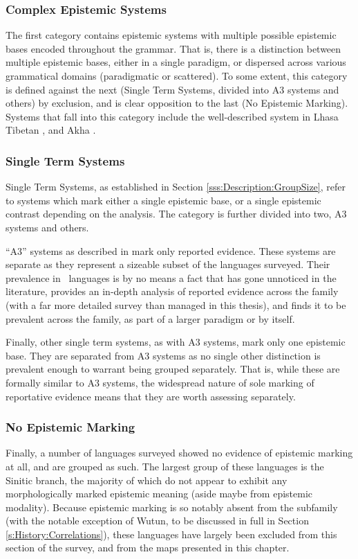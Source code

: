 \subsubsection{Complex Epistemic Systems}
The first category contains epistemic systems with multiple possible epistemic bases encoded throughout the grammar. That is, there is a distinction between multiple epistemic bases, either in a single paradigm, or dispersed across various grammatical domains (paradigmatic or scattered). To some extent, this category is defined against the next (Single Term Systems, divided into A3 systems and others) by exclusion, and is clear opposition to the last (No Epistemic Marking). Systems that fall into this category include the well-described system in Lhasa Tibetan \cite{DeLancey2017Tibetan}, and Akha \cite{Thurgood1986}.
\subsubsection{Single Term Systems}
Single Term Systems, as established in Section \ref{sss:Description:GroupSize}, refer to systems which mark either a single epistemic base, or a single epistemic contrast depending on the analysis. The category is further divided into two, A3 systems and others.

``A3'' systems as described in  mark only reported evidence. These systems are separate as they represent a sizeable subset of the languages surveyed. Their prevalence in \lfam\ languages is by no means a fact that has gone unnoticed in the literature,  provides an in-depth analysis of reported evidence across the family (with a far more detailed survey than managed in this thesis), and finds it to be prevalent across the family, as part of a larger paradigm or by itself.

Finally, other single term systems, as with A3 systems, mark only one epistemic base. They are separated from A3 systems as no single other distinction is prevalent enough to warrant being grouped separately. That is, while these are formally similar to A3 systems, the widespread nature of sole marking of reportative evidence means that they are worth assessing separately. 
\subsubsection{No Epistemic Marking}
Finally, a number of languages surveyed showed no evidence of epistemic marking at all, and are grouped as such. The largest group of these languages is the Sinitic branch, the majority of which do not appear to exhibit any morphologically marked epistemic meaning (aside maybe from epistemic modality). Because epistemic marking is so notably absent from the subfamily (with the notable exception of Wutun, to be discussed in full in Section \ref{s:History:Correlations}), these languages have largely been excluded from this section of the survey, and from the maps presented in this chapter.

